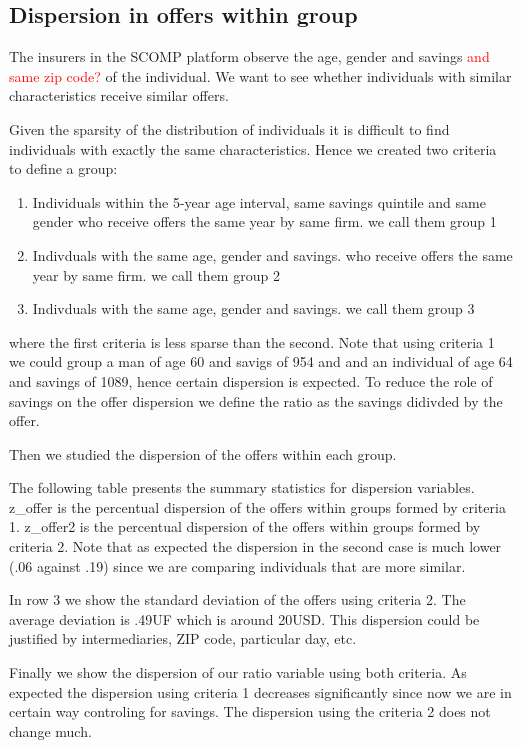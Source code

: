 \documentclass[12pt]{article}
\begin{document}
\subsection{Dispersion in offers within group}

The insurers in the SCOMP platform observe the age, gender and savings \textcolor{red}{and same zip code?} of the individual. We want to see whether individuals with similar characteristics receive similar offers. 

Given the sparsity of the distribution of individuals it is difficult to find individuals with exactly the same characteristics. Hence we created two criteria to define a group: 
\begin{enumerate}
    \item Individuals within the 5-year age interval, same savings quintile and same gender who receive offers the same year by same firm. we call them group 1  
    \item Indivduals with the same age, gender and savings. who receive offers the same year by same firm. we call them group 2
    \item   Indivduals with the same age, gender and savings. we call them group 3
\end{enumerate}
where the first criteria is less sparse than the second. 
Note that using criteria 1 we could group a man of age 60 and savigs of 954 and and an individual of age 64 and savings of 1089, hence certain dispersion is expected. To reduce the role of savings on the offer dispersion we define the ratio as the savings didivded by the offer. 

Then we studied the dispersion of the offers within each group. 

The following table presents the summary statistics for dispersion variables. 
z\_offer is the percentual dispersion of the offers within groups formed by criteria 1. 
z\_offer2 is the percentual dispersion of the offers within groups formed by criteria 2.
Note that as expected the dispersion in the second case is much lower (.06 against .19) since we are comparing individuals that are more similar. 

In row 3 we show the standard deviation of the offers using criteria 2. The average deviation is .49UF which is around 20USD. This dispersion could be justified by intermediaries, ZIP code, particular day, etc. 

Finally we show the dispersion of our ratio variable using both criteria. As expected the dispersion using criteria 1 decreases significantly since now we are in certain way controling for savings. The dispersion using the criteria 2 does not change much. 
\end{document}
